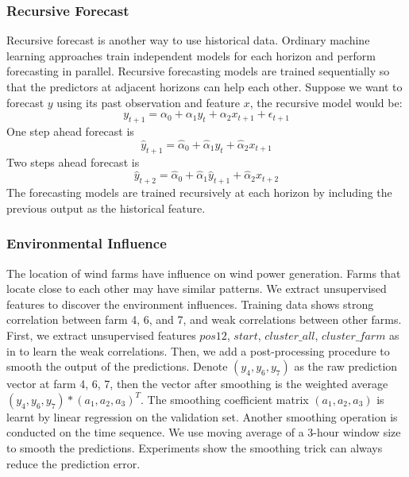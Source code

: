 \documentclass[conference]{IEEEtran}
\begin{document}
\subsubsection{Recursive Forecast}
Recursive forecast is another way to use historical data. Ordinary machine learning approaches train independent models for each horizon and perform forecasting in parallel. Recursive forecasting models are trained sequentially so that the predictors at adjacent horizons can help each other. Suppose we want to forecast $y$ using its past observation and feature $x$, the recursive model would be:
\begin{equation}
    y_{t+1} = \alpha_0 + \alpha_1 y_t + \alpha_2 x_{t+1} + \epsilon_{t+1}
\end{equation}
One step ahead forecast is
\begin{equation}
    \hat{y}_{t+1} = \hat{\alpha}_0 + \hat{\alpha}_1 y_t + \hat{\alpha}_2 x_{t+1}
\end{equation}
Two steps ahead forecast is
\begin{equation}
    \hat{y}_{t+2} = \hat{\alpha}_0 + \hat{\alpha}_1 \hat{y}_{t+1} + \hat{\alpha}_2 x_{t+2}
\end{equation}
The forecasting models are trained recursively at each horizon by including the previous output as the historical feature. %

\subsubsection{Environmental Influence}
The location of wind farms have influence on wind power generation. Farms that locate close to each other may have similar patterns. We extract unsupervised features to discover the environment influences. Training data shows strong correlation between farm 4, 6, and 7, and weak correlations between other farms. First, we extract unsupervised features $pos12$, $start$, $cluster\_all$, $cluster\_farm$ as in \cite{SILVA2014395} to learn the weak correlations. Then, we add a post-processing procedure to smooth the output of the predictions. Denote $(y_4, y_6, y_7)$ as the raw prediction vector at farm 4, 6, 7, then the vector after smoothing is the weighted average $(y_4, y_6, y_7)*(a_1,a_2,a_3)^T$. The smoothing coefficient matrix $(a_1,a_2,a_3)$ is learnt by linear regression on the validation set. Another smoothing operation is conducted on the time sequence. We use moving average of a 3-hour window size to smooth the predictions. Experiments show the smoothing trick can always reduce the prediction error.
\end{document}
